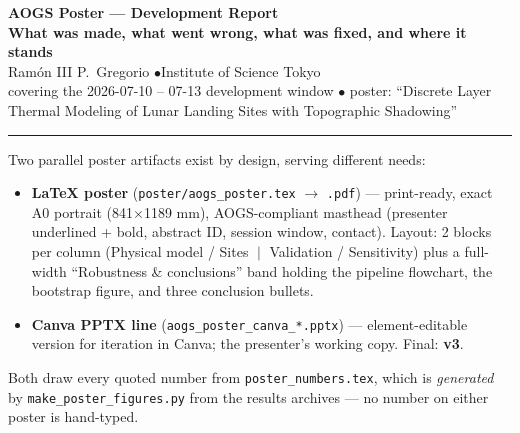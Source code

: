 \documentclass[11pt]{article}
\newcommand{\shead}[1]{\medskip\noindent{\color{teal}\large\bfseries #1}\par\nobreak\smallskip}
\begin{document}
\thispagestyle{empty}

\begin{center}
{\LARGE\bfseries AOGS Poster --- Development Report}\\[2pt]
{\large\color{teal}\bfseries What was made, what went wrong, what was fixed, and where it stands}\\[4pt]
{\small Ram\'on III P.\ Gregorio \quad$\bullet$\quad Institute of Science Tokyo}\\[-2pt]
{\footnotesize\color{dim} covering the 2026-07-10 -- 07-13 development window \quad$\bullet$\quad
 poster: ``Discrete Layer Thermal Modeling of Lunar Landing Sites with Topographic Shadowing''}
\end{center}
\vspace{2pt}
{\color{teal}\rule{\linewidth}{0.9pt}}

\shead{1\enspace What was built}
Two parallel poster artifacts exist by design, serving different needs:
\begin{itemize}
  \item \textbf{LaTeX poster} (\texttt{poster/aogs\_poster.tex} $\to$
    \texttt{.pdf}) --- print-ready, exact A0 portrait (841$\times$1189 mm),
    AOGS-compliant masthead (presenter underlined + bold, abstract ID,
    session window, contact). Layout: 2 blocks per column
    (Physical model / Sites $\;\vert\;$ Validation / Sensitivity) plus a
    full-width ``Robustness \& conclusions'' band holding the pipeline
    flowchart, the bootstrap figure, and three conclusion bullets.
  \item \textbf{Canva PPTX line} (\texttt{aogs\_poster\_canva\_*.pptx}) ---
    element-editable version for iteration in Canva; the presenter's
    working copy. Final: \textbf{v3}.
\end{itemize}
Both draw every quoted number from \texttt{poster\_numbers.tex}, which is
\emph{generated} by \texttt{make\_poster\_figures.py} from the results
archives --- no number on either poster is hand-typed.
\end{document}
